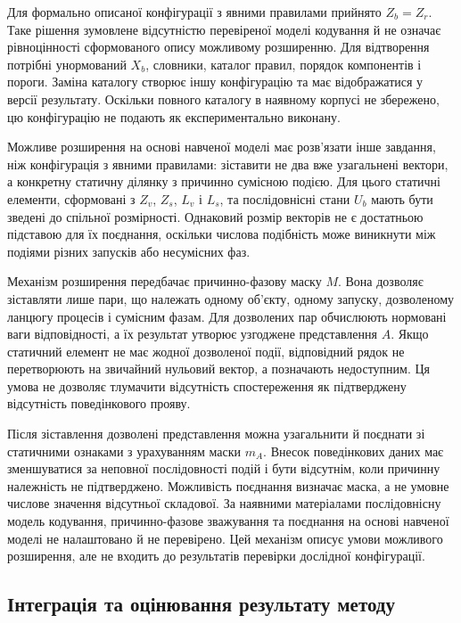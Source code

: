 Для формально описаної конфігурації з явними правилами прийнято $Z_b=Z_r$. Таке рішення зумовлене відсутністю перевіреної моделі кодування й не означає рівноцінності сформованого опису можливому розширенню. Для відтворення потрібні унормований $X_b$, словники, каталог правил, порядок компонентів і пороги. Заміна каталогу створює іншу конфігурацію та має відображатися у версії результату. Оскільки повного каталогу в наявному корпусі не збережено, цю конфігурацію не подають як експериментально виконану.

Можливе розширення на основі навченої моделі має розв’язати інше завдання, ніж конфігурація з явними правилами: зіставити не два вже узагальнені вектори, а конкретну статичну ділянку з причинно сумісною подією. Для цього статичні елементи, сформовані з $Z_v$, $Z_s$, $L_v$ і $L_s$, та послідовнісні стани $U_b$ мають бути зведені до спільної розмірності. Однаковий розмір векторів не є достатньою підставою для їх поєднання, оскільки числова подібність може виникнути між подіями різних запусків або несумісних фаз.

Механізм розширення передбачає причинно-фазову маску $M$. Вона дозволяє зіставляти лише пари, що належать одному об’єкту, одному запуску, дозволеному ланцюгу процесів і сумісним фазам. Для дозволених пар обчислюють нормовані ваги відповідності, а їх результат утворює узгоджене представлення $A$. Якщо статичний елемент не має жодної дозволеної події, відповідний рядок не перетворюють на звичайний нульовий вектор, а позначають недоступним. Ця умова не дозволяє тлумачити відсутність спостереження як підтверджену відсутність поведінкового прояву.

Після зіставлення дозволені представлення можна узагальнити й поєднати зі статичними ознаками з урахуванням маски $m_A$. Внесок поведінкових даних має зменшуватися за неповної послідовності подій і бути відсутнім, коли причинну належність не підтверджено. Можливість поєднання визначає маска, а не умовне числове значення відсутньої складової. За наявними матеріалами послідовнісну модель кодування, причинно-фазове зважування та поєднання на основі навченої моделі не налаштовано й не перевірено. Цей механізм описує умови можливого розширення, але не входить до результатів перевірки дослідної конфігурації.

\subsection{Інтеграція та оцінювання результату методу}

